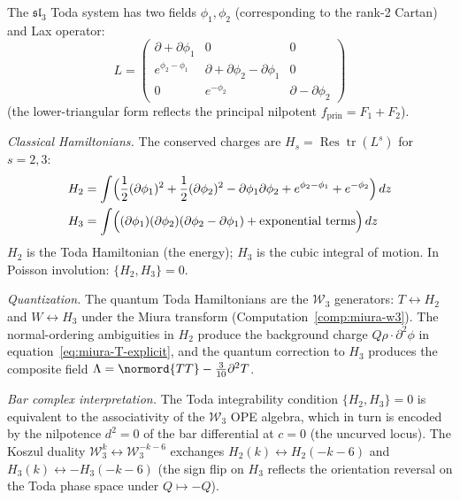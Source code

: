 \begin{computation}
\label{comp:toda-sl3}

The $\mathfrak{sl}_3$ Toda system has two fields $\phi_1, \phi_2$
(corresponding to the rank-2 Cartan) and Lax operator:
\begin{equation}
L = \begin{pmatrix}
\partial + \partial\phi_1 & 0 & 0 \\
e^{\phi_2 - \phi_1} & \partial + \partial\phi_2 - \partial\phi_1 & 0 \\
0 & e^{-\phi_2} & \partial - \partial\phi_2
\end{pmatrix}
\end{equation}
(the lower-triangular form reflects the principal nilpotent
$f_{\mathrm{prin}} = F_1 + F_2$).

\emph{Classical Hamiltonians.}
The conserved charges are $H_s = \operatorname{Res} \operatorname{tr}(L^s)$
for $s = 2, 3$:
\begin{align}
H_2 &= \int \Bigl(\frac{1}{2}(\partial\phi_1)^2
+ \frac{1}{2}(\partial\phi_2)^2
- \partial\phi_1 \partial\phi_2
+ e^{\phi_2 - \phi_1} + e^{-\phi_2}\Bigr)\, dz \\
H_3 &= \int \Bigl((\partial\phi_1)(\partial\phi_2)(\partial\phi_2 - \partial\phi_1)
+ \text{exponential terms}\Bigr)\, dz
\end{align}
$H_2$ is the Toda Hamiltonian (the energy); $H_3$ is the cubic
integral of motion.  In Poisson involution: $\{H_2, H_3\} = 0$.

\emph{Quantization.}
The quantum Toda Hamiltonians are the $\mathcal{W}_3$ generators:
$T \leftrightarrow H_2$ and $W \leftrightarrow H_3$ under the Miura
transform (Computation~\ref{comp:miura-w3}).  The normal-ordering
ambiguities in $H_2$ produce the background charge
$Q \rho \cdot \partial^2\phi$ in equation~\eqref{eq:miura-T-explicit},
and the quantum correction to $H_3$ produces the composite field
$\Lambda = \normord{TT} - \frac{3}{10}\partial^2 T$.

\emph{Bar complex interpretation.}
The Toda integrability condition $\{H_2, H_3\} = 0$ is equivalent
to the associativity of the $\mathcal{W}_3$ OPE algebra, which in turn
is encoded by the nilpotence $d^2 = 0$ of the bar differential at
$c = 0$ (the uncurved locus).  The Koszul duality
$\mathcal{W}_3^k \leftrightarrow \mathcal{W}_3^{-k-6}$ exchanges
$H_2(k) \leftrightarrow H_2(-k-6)$ and $H_3(k) \leftrightarrow -H_3(-k-6)$
(the sign flip on $H_3$ reflects the orientation reversal on the Toda
phase space under $Q \mapsto -Q$).
\end{computation}

